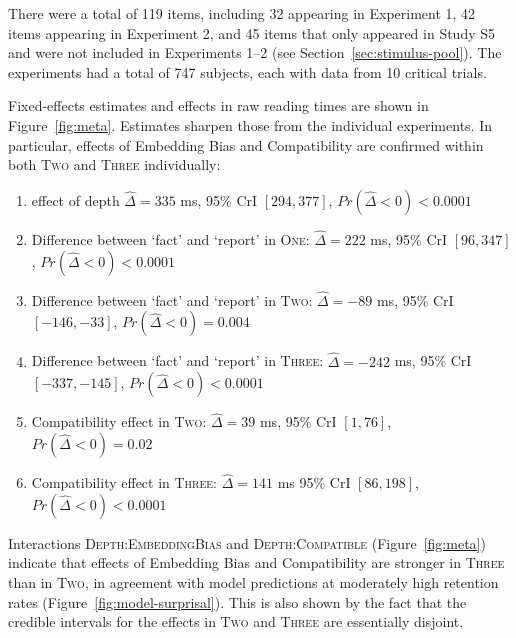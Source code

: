 There were a total of 119 items, including 32 appearing in Experiment 1, 42 items appearing in Experiment 2, and 45 items that only appeared in Study S5 and were not included in Experiments 1--2 (see Section~\ref{sec:stimulus-pool}).
The experiments had a total of 747 subjects, each with data from 10 critical trials.

Fixed-effects estimates and effects in raw reading times are shown in Figure~\ref{fig:meta}.
Estimates sharpen those from the individual experiments. In particular, effects of Embedding Bias and Compatibility are confirmed within both \textsc{Two} and \textsc{Three} individually:
\begin{enumerate}
	\item effect of depth $\widehat{\Delta} = 335$ ms, 95\% CrI $[294, 377]$, $Pr(\widehat{\Delta}<0) < 0.0001$
	\item Difference between `fact' and `report' in \textsc{One}: $\widehat{\Delta} = 222$  ms,   95\% CrI $[96 ,  347]$, $Pr(\widehat{\Delta}<0) < 0.0001$
	\item Difference between `fact' and `report' in \textsc{Two}: $\widehat{\Delta} = -89$   ms,  95\% CrI $[-146  , -33]$, $Pr(\widehat{\Delta}<0) = 0.004$
	\item Difference between `fact' and `report' in \textsc{Three}: $\widehat{\Delta} = -242$  ms,   95\% CrI $[-337,   -145]$, $Pr(\widehat{\Delta}<0) < 0.0001$
	\item Compatibility effect in \textsc{Two}: $\widehat{\Delta} = 39$ ms,   95\% CrI $[1  , 76]$,   $Pr(\widehat{\Delta}<0) =  0.02$
	\item Compatibility effect in \textsc{Three}:  $\widehat{\Delta} = 141$ ms   95\% CrI $[86,   198]$,    $Pr(\widehat{\Delta}<0) < 0.0001$
\end{enumerate}
Interactions \textsc{Depth}:\textsc{EmbeddingBias} and \textsc{Depth}:\textsc{Compatible} (Figure~\ref{fig:meta}) indicate that effects of Embedding Bias and Compatibility are stronger in \textsc{Three} than in \textsc{Two}, in agreement with model predictions at moderately high retention rates (Figure~\ref{fig:model-surprisal}).
This is also shown by the fact that the credible intervals for the effects in \textsc{Two} and \textsc{Three} are essentially disjoint.





